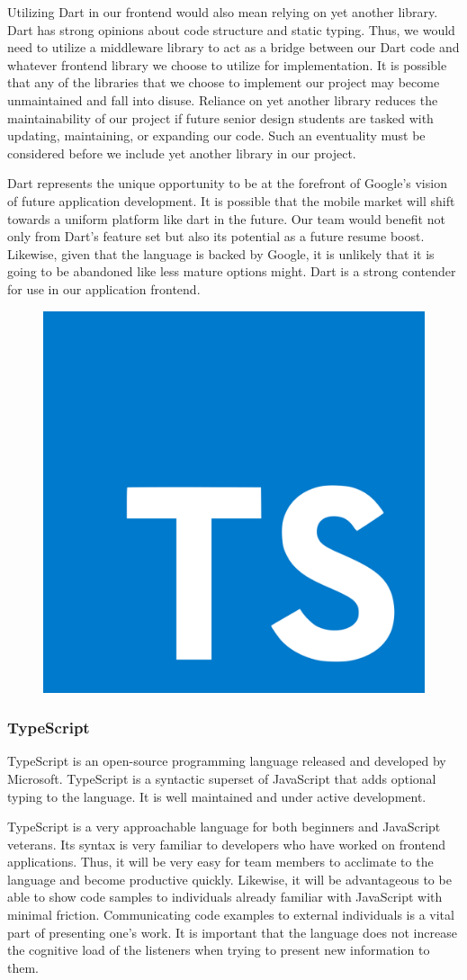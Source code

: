 \documentclass[12pt]{report}
\begin{document}
\begin{enumerate}
Utilizing Dart in our frontend would also mean relying on yet another library. Dart has strong opinions about code structure and static typing. Thus, we would need to utilize a middleware library to act as a bridge between our Dart code and whatever frontend library we choose to utilize for implementation. It is possible that any of the libraries that we choose to implement our project may become unmaintained and fall into disuse. Reliance on yet another library reduces the maintainability of our project if future senior design students are tasked with updating, maintaining, or expanding our code. Such an eventuality must be considered before we include yet another library in our project.

Dart represents the unique opportunity to be at the forefront of Google's vision of future application development. It is possible that the mobile market will shift towards a uniform platform like dart in the future. Our team would benefit not only from Dart's feature set but also its potential as a future resume boost. Likewise, given that the language is backed by Google, it is unlikely that it is going to be abandoned like less mature options might. Dart is a strong contender for use in our application frontend.

\begin{figure}[h]
	\centering
	\includegraphics[width=0.25\linewidth]{typescript}
\end{figure}

\subsubsection*{TypeScript}

TypeScript is an open-source programming language released and developed by Microsoft. TypeScript is a syntactic superset of JavaScript that adds optional typing to the language.\cite{typescripthomepage} It is well maintained and under active development.

TypeScript is a very approachable language for both beginners and JavaScript veterans. Its syntax is very familiar to developers who have worked on frontend applications. Thus, it will be very easy for team members to acclimate to the language and become productive quickly. Likewise, it will be advantageous to be able to show code samples to individuals already familiar with JavaScript with minimal friction. Communicating code examples to external individuals is a vital part of presenting one's work. It is important that the language does not increase the cognitive load of the listeners when trying to present new information to them.


\end{enumerate}
\end{document}
